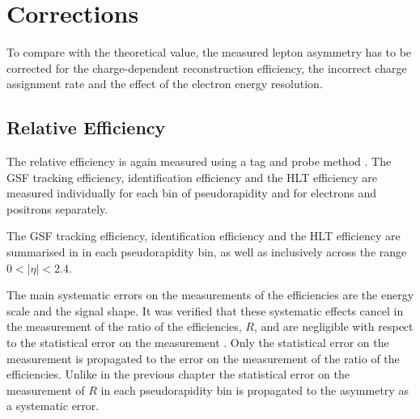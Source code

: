 \section{Corrections}
\label{sec:corrections2}

To compare with the theoretical value, the measured lepton asymmetry has to be
corrected for the charge-dependent reconstruction efficiency, the incorrect charge
assignment rate and the effect of the electron energy resolution.

\subsection{Relative Efficiency}
The relative efficiency is again measured using a tag and probe method \cite{adam2009tag}.
The {GSF} tracking efficiency,
identification efficiency and the {HLT} efficiency are measured individually
for each bin of pseudorapidity and for electrons and positrons separately. 

The {GSF} tracking efficiency, identification efficiency and the {HLT}
efficiency are summarised in 
in each pseudorapidity bin, as well as inclusively
across the range $0<| \eta |< 2.4$. 

The main systematic errors on the measurements of the efficiencies are the
energy scale and the signal shape. It was verified that these systematic effects
cancel in the measurement of the ratio of the efficiencies, $R$, and are
negligible with respect to the statistical error on the measurement
\cite{bendavid2011electron}.  Only the statistical error on the measurement is
propagated to the error on the measurement of the ratio of the efficiencies.
Unlike in the previous chapter the statistical error on the measurement of $R$
in each pseudorapidity bin is propagated to the asymmetry as a systematic error. 

